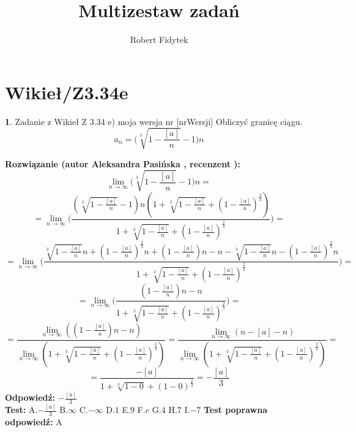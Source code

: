 \documentclass[12pt, a4paper]{article}
\title{Multizestaw zadań}
\author{Robert Fidytek}
\date{}
\theoremstyle{definition} %
\newtheorem{zad}{}
\newcommand{\kategoria}[1]{\section{#1}} %
\newcommand{\zadStart}[1]{\begin{zad}#1\newline} %
\newcommand{\zadStop}{\end{zad}}   %
\newcommand{\rozwStart}[2]{\noindent \textbf{Rozwiązanie (autor #1 , recenzent #2): }\newline} %
\newcommand{\rozwStop}{\newline}                                            %
\newcommand{\odpStart}{\noindent \textbf{Odpowiedź:}\newline}    %
\newcommand{\odpStop}{\newline}                                             %
\newcommand{\testStart}{\noindent \textbf{Test:}\newline} %
\newcommand{\testStop}{\newline} %
\newcommand{\kluczStart}{\noindent \textbf{Test poprawna odpowiedź:}\newline} %
\newcommand{\kluczStop}{\newline} %
\begin{document}
\maketitle


\kategoria{Wikieł/Z3.34e}
\zadStart{Zadanie z Wikieł Z 3.34 e) moja wersja nr [nrWersji]}
Obliczyć granicę ciągu. $$a_n=\bigg(\sqrt[3]{1-\frac{[a]}{n}}-1\bigg)n$$
\zadStop
\rozwStart{Aleksandra Pasińska}{}
$$\lim_{n\rightarrow \infty}\bigg(\sqrt[3]{1-\frac{[a]}{n}}-1\bigg)n=$$
$$=\lim_{n\rightarrow \infty}\bigg(\frac{(\sqrt[3]{1-\frac{[a]}{n}}-1)n(1+\sqrt[3]{1-\frac{[a]}{n}}+(1-\frac{[a]}{n})^{\frac{2}{3}})}{1+\sqrt[3]{1-\frac{[a]}{n}}+(1-\frac{[a]}{n})^{\frac{2}{3}}}\bigg)=$$
$$=\lim_{n\rightarrow \infty}\bigg(\frac{\sqrt[3]{1-\frac{[a]}{n}}n+(1-\frac{[a]}{n})^\frac{2}{3}n+(1-\frac{[a]}{n})n-n-\sqrt[3]{1-\frac{[a]}{n}}n-(1-\frac{[a]}{n})^\frac{2}{3}n}{1+\sqrt[3]{1-\frac{[a]}{n}}+(1-\frac{[a]}{n})^{\frac{2}{3}}}\bigg)=$$
$$=\lim_{n\rightarrow \infty}\bigg(\frac{(1-\frac{[a]}{n})n-n}{1+\sqrt[3]{1-\frac{[a]}{n}}+(1-\frac{[a]}{n})^{\frac{2}{3}}}\bigg)=$$
$$=\frac{\lim_{n\rightarrow \infty}((1-\frac{[a]}{n})n-n)}{\lim_{n\rightarrow \infty}(1+\sqrt[3]{1-\frac{[a]}{n}}+(1-\frac{[a]}{n})^{\frac{2}{3}})}=\frac{\lim_{n\rightarrow \infty}(n-[a]-n)}{\lim_{n\rightarrow \infty}(1+\sqrt[3]{1-\frac{[a]}{n}}+(1-\frac{[a]}{n})^{\frac{2}{3}})}=$$
$$=\frac{-[a]}{1+\sqrt[3]{1-0}+(1-0)^{\frac{2}{3}}}=-\frac{[a]}{3}$$
\rozwStop
\odpStart
$-\frac{[a]}{3}$\\
\odpStop
\testStart
A.$-\frac{[a]}{3}$
B.$\infty$
C.$-\infty$
D.$1$
E.$9$
F.$e$
G.$4$
H.$7$
I.$-7$
\testStop
\kluczStart
A
\kluczStop
\end{document}

